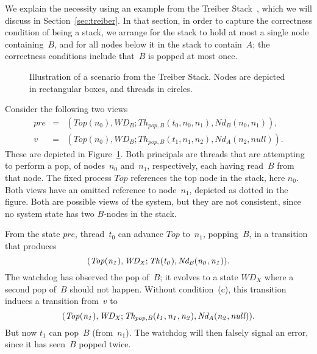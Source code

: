 We explain the necessity using an example from the Treiber
Stack~\cite{treiber}, which we will discuss in Section~\ref{sec:treiber}.  In
that section, in order to capture the correctness condition of being a stack,
we arrange for the stack to hold at most a single node containing~$B$, and for
all nodes below it in the stack to contain~$A$; the correctness conditions
include that~$B$ is popped at most once.


\begin{figure}\small
\def\addLabel#1#2{\draw #1++(0,0.5) node {#2};}
\begin{center}
\end{center}
\caption{Illustration of a scenario from the Treiber Stack.  Nodes are
  depicted in rectangular boxes, and threads in circles.}
\label{fig:missingCommon}
\end{figure}


Consider the following two views
%
\begin{eqnarray*}
pre & = &  (Top(n_0), WD_B; Th_{pop,B}(t_0, n_0, n_1), Nd_B(n_0, n_1)), \\
v & = & (Top(n_0), WD_B; Th_{pop,B}(t_1, n_1, n_2), Nd_A(n_2, null)).
\end{eqnarray*}
%
These are depicted in Figure~\ref{fig:missingCommon}.  Both principals are
threads that are attempting to perform a pop, of nodes~$n_0$ and~$n_1$,
respectively, each having read~$B$ from that node.  The fixed process $Top$
references the top node in the stack, here $n_0$.  
Both views have an omitted
reference to node~$n_1$, depicted as dotted in the figure.  Both are possible
views of the system, but they are not consistent, since no system state has
two $B$-nodes in the stack.

From the state $pre$, thread~$t_0$ can advance $Top$ to~$n_1$,
popping~$B$, in a transition that produces
\[\mit
(Top(n_1), WD_X; Th(t_0), Nd_B(n_0, n_1)).
\]
The watchdog has observed the pop of~$B$; it evolves to a state $WD_X$ where a
second pop of~$B$ should not happen.  
Without condition~(c), this transition  induces a transition from~$v$ to
\[\mit
(Top(n_1), WD_X; Th_{pop,B}(t_1, n_1, n_2), Nd_A(n_2, null)).
\]
But now $t_1$ can pop~$B$ (from~$n_1$).  The watchdog will then falsely signal
an error, since it has seen~$B$ popped twice. 

